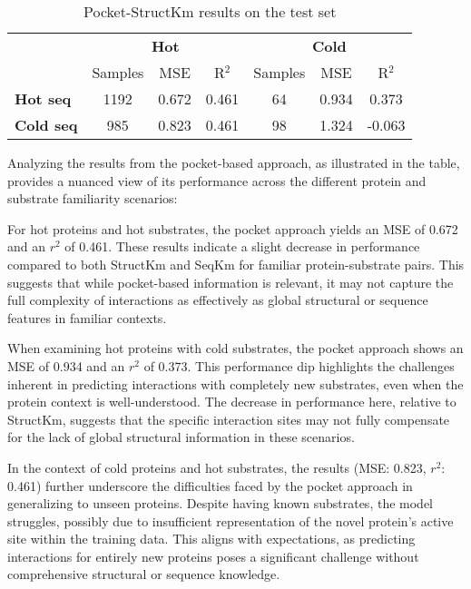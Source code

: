 \begin{table}[ht]
  \centering
  \begin{tabular}{lcccccc}
  \hline
   & \multicolumn{3}{c}{\textbf{Hot}} & \multicolumn{3}{c}{\textbf{Cold}} \\
   & Samples & MSE & R\(^2\) & Samples & MSE & R\(^2\) \\ \hline
  \textbf{Hot seq}  & 1192 & 0.672 & 0.461 & 64 & 0.934 & 0.373 \\
  \textbf{Cold seq} & 985 & 0.823 & 0.461 & 98 & 1.324 & -0.063 \\ \hline
  \end{tabular}
  \caption{Pocket-StructKm results on the test set}
  \label{tab:results_pocket_test}
 \end{table}

 Analyzing the results from the pocket-based approach, as illustrated in the table, provides a nuanced view of its performance across the different protein and substrate familiarity scenarios:

 For hot proteins and hot substrates, the pocket approach yields an MSE of 0.672 and an $r^2$ of 0.461. These results indicate a slight decrease in performance compared to both StructKm and SeqKm for familiar protein-substrate pairs. This suggests that while pocket-based information is relevant, it may not capture the full complexity of interactions as effectively as global structural or sequence features in familiar contexts.
 
 When examining hot proteins with cold substrates, the pocket approach shows an MSE of 0.934 and an $r^2$ of 0.373. This performance dip highlights the challenges inherent in predicting interactions with completely new substrates, even when the protein context is well-understood. The decrease in performance here, relative to StructKm, suggests that the specific interaction sites may not fully compensate for the lack of global structural information in these scenarios.
 
 In the context of cold proteins and hot substrates, the results (MSE: 0.823, $r^2$: 0.461) further underscore the difficulties faced by the pocket approach in generalizing to unseen proteins. Despite having known substrates, the model struggles, possibly due to insufficient representation of the novel protein's active site within the training data. This aligns with expectations, as predicting interactions for entirely new proteins poses a significant challenge without comprehensive structural or sequence knowledge.
 
